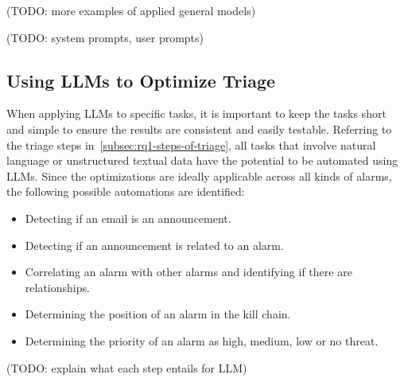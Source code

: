 (TODO: more examples of applied general models) %

(TODO: system prompts, user prompts) %

\subsection{Using LLMs to Optimize Triage}
\label{subsec:rq1-llms-in-context}

When applying LLMs to specific tasks, it is important to keep the tasks short and simple to ensure the results are
consistent and easily testable.
Referring to the triage steps in\ \ref{subsec:rq1-steps-of-triage}, all tasks that involve natural language or
unstructured textual data have the potential to be automated using LLMs.
Since the optimizations are ideally applicable across all kinds of alarms, the following possible automations are
identified:
\begin{itemize}
    \item Detecting if an email is an announcement.
    \item Detecting if an announcement is related to an alarm.
    \item Correlating an alarm with other alarms and identifying if there are relationships.
    \item Determining the position of an alarm in the kill chain.
    \item Determining the priority of an alarm as high, medium, low or no threat.
\end{itemize}

(TODO: explain what each step entails for LLM) %

